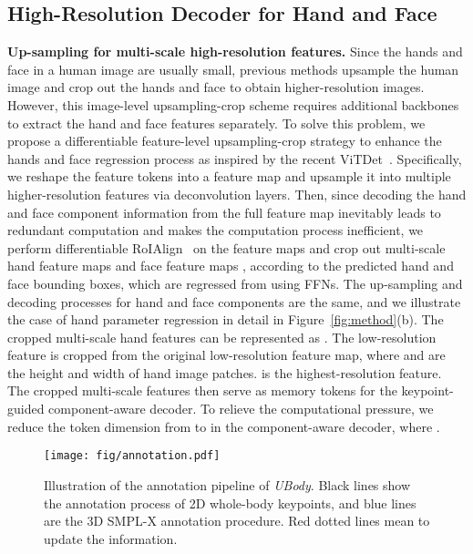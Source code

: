 \documentclass[10pt,twocolumn,letterpaper]{article}
\newcommand{\dataname}{\emph{UBody}\xspace}
\begin{document}
\subsection{High-Resolution Decoder for Hand and Face}
\label{sec:method_3}
\noindent \textbf{Up-sampling for multi-scale high-resolution features.}
Since the hands and face in a human image are usually small, previous methods upsample the human image and crop out the hands and face to obtain higher-resolution images. However, this image-level upsampling-crop scheme requires additional backbones to extract the hand and face features separately. 
To solve this problem, we propose a differentiable feature-level upsampling-crop strategy to enhance the hands and face regression process as inspired by the recent ViTDet~\cite{Li2022vitdet}.
Specifically, we reshape the feature tokens  into a feature map and upsample it into multiple higher-resolution features  via deconvolution layers. 
Then, since decoding the hand and face component information from the full feature map inevitably leads to redundant computation and makes the computation process inefficient, we perform differentiable RoIAlign~\cite{He_2017_maskrcnn} on the feature maps and crop out multi-scale hand feature maps  and face feature maps , according to the predicted hand and face bounding boxes, which are regressed from   using FFNs. 
The up-sampling and decoding processes for hand and face components are the same, and we illustrate the case of hand parameter regression in detail in Figure~\ref{fig:method}(b).
The cropped multi-scale hand features can be represented as . The low-resolution feature  is cropped from the original low-resolution feature map, where  and  are the height and width of hand image patches.  is the highest-resolution feature. The cropped multi-scale features then serve as memory tokens  for the keypoint-guided component-aware decoder.
To relieve the computational pressure, we reduce the token dimension from  to  in the component-aware decoder, where . 

\begin{figure*}[h]
\centering
\texttt{[image: fig/annotation.pdf]}
\vspace{-0.3cm}
\caption{
Illustration of the annotation pipeline of \dataname. Black lines show the annotation process of 2D whole-body keypoints, and blue lines are the 3D SMPL-X annotation procedure. Red dotted lines mean to update the information.
}
\label{fig:ubody_annotation}
\vspace{-0.3cm}
\end{figure*}
\end{document}
